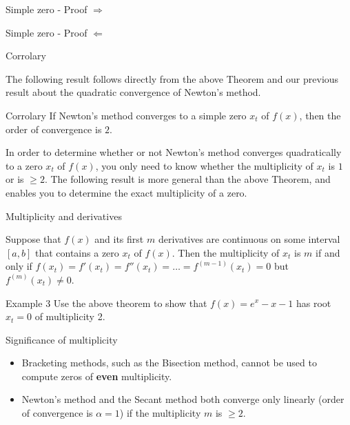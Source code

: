 \documentclass[12pt]{beamer}
\begin{document}
\begin{frame}{Simple zero - Proof $\Rightarrow$} 

\end{frame} 

\begin{frame}{Simple zero - Proof $\Leftarrow$} 

\end{frame} 


\begin{frame}{Corrolary} 

The following result follows directly from the above Theorem and our 
previous result about the quadratic convergence of Newton's method. 

\begin{block}{Corrolary} 
If Newton’s method converges to a simple zero $x_t$ of $f(x)$, 
then the order of convergence is $2$. 
\end{block} 

In order to determine whether or not Newton’s method converges
quadratically to a zero $x_t$ of $f(x)$, you only need to know whether
the multiplicity of $x_t$ is $1$ or is $\geq 2$. The following result
is more general than the above Theorem, and enables you to determine the
exact multiplicity of a zero.

\end{frame} 


\begin{frame}{Multiplicity and derivatives}

\begin{theorem}

Suppose that $f(x)$ and its first $m$ derivatives are continuous on some
interval $[a,b]$ that contains a zero $x_t$ of $f(x)$. Then the
multiplicity of $x_t$ is $m$ if and only if $f(x_t)= f'(x_t) = f''(x_t) = \dots =
f^{(m-1)}(x_t)=0$ but $f^{(m)}(x_t) \neq 0$.
\end{theorem} 

\end{frame} 

\begin{frame}{Example 3} 
Use the above theorem to show that $f(x) = e^{x} - x - 1$ has root $x_t=0$ of multiplicity 2.
\vspace{3 in}
\end{frame} 

\begin{frame}{Significance of multiplicity} 

\begin{itemize} 
\item Bracketing methods, such as the Bisection method, cannot be used to compute zeros of {\bf even} multiplicity. 

\item Newton's method and the Secant method both converge only linearly (order of convergence is $\alpha = 1$) if the multiplicity $m$ is $\geq 2$. 

\end{itemize} 
\end{frame} 
\end{document}
